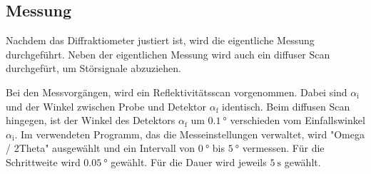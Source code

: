 \subsection{Messung}
\label{subsec:messung}
Nachdem das Diffraktiometer justiert ist, wird
die eigentliche Messung durchgeführt.
Neben der eigentlichen Messung wird auch ein diffuser Scan durchgefürt,
um Störsignale abzuziehen.

Bei den Messvorgängen, wird ein Reflektivitätsscan vorgenommen.
Dabei sind $\alpha_{\text{i}}$ und der Winkel zwischen Probe und Detektor
$\alpha_{\text{f}}$ identisch. Beim diffusen Scan hingegen,
ist der Winkel des Detektors $\alpha_{\text{f}}$ um
$\SI{0.1}{\degree}$ verschieden vom Einfallswinkel $\alpha_{\text{i}}$.
Im verwendeten Programm, das die Messeinstellungen verwaltet, wird
"Omega / 2Theta" ausgewählt und ein Intervall von $\SI{0}{\degree}$ bis
$\SI{5}{\degree}$ vermessen.
Für die Schrittweite wird $\SI{0.05}{\degree}$
gewählt. Für die Dauer wird jeweils $\SI{5}{\second}$ gewählt.



